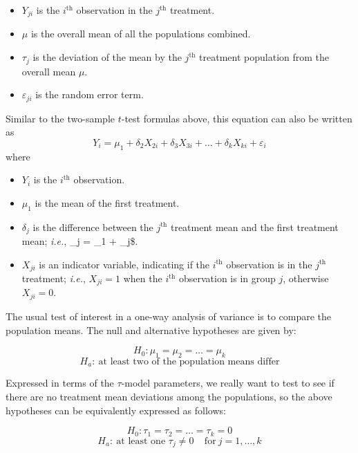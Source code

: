 \documentclass[
]{book}
\providecommand{\tightlist}{%
  \setlength{\itemsep}{0pt}\setlength{\parskip}{0pt}}
\begin{document}
\begin{itemize}
\tightlist
\item
  \(Y_{ji}\) is the \(i^\mathrm{th}\) observation in the \(j^\mathrm{th}\) treatment.
\item
  \(\mu\) is the overall mean of all the populations combined.
\item
  \(\tau_j\) is the deviation of the mean by the \(j^\mathrm{th}\) treatment population from the overall mean \(\mu\).
\item
  \(\varepsilon_{ji}\) is the random error term.
\end{itemize}

Similar to the two-sample \(t\)-test formulas above, this equation can also be written as
\begin{equation}
Y_{i} = \mu_1 + \delta_2 X_{2i} + \delta_3 X_{3i} + \ldots + \delta_k X_{ki} + \varepsilon_{i}
\label{eq:onewayAnovaLinearModel}
\end{equation}
where

\begin{itemize}
\tightlist
\item
  \(Y_i\) is the \(i^\mathrm{th}\) observation.
\item
  \(\mu_1\) is the mean of the first treatment.
\item
  \(\delta_j\) is the difference between the \(j^\mathrm{th}\) treatment mean and the first treatment mean; \emph{i.e.}, \mu\_j = \mu\_1 + \delta\_j\$.
\item
  \(X_{ji}\) is an indicator variable, indicating if the \(i^\mathrm{th}\) observation is in the \(j^\mathrm{th}\) treatment; \emph{i.e.}, \(X_{ji}=1\) when the \(i^\mathrm{th}\) observation is in group \(j\), otherwise \(X_{ji}=0\).
\end{itemize}

The usual test of interest in a one-way analysis of variance is to compare the population means.
The null and alternative hypotheses are given by:

\[H_0: \mu_1 = \mu_2 = \ldots = \mu_k\]
\[H_a: ~\textrm{at least two of the population means differ}\]

Expressed in terms of the \(\tau\)-model parameters, we really want to test to see if there are no treatment mean deviations among the populations, so the above hypotheses can be equivalently expressed as follows:

\[H_0: \tau_1 = \tau_2 = \ldots = \tau_k = 0\]
\[H_a: ~\text{at least one } \tau_j \neq 0~~~~~\text{for}~j=1,\ldots, k\]
\end{document}
